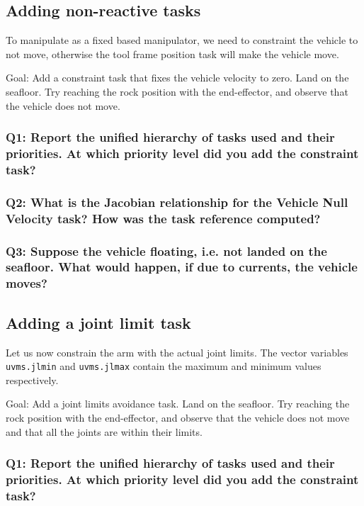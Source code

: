 \documentclass{article}
\begin{document}
\subsection{Adding non-reactive tasks}
To manipulate as a fixed based manipulator, we need to constraint the vehicle to not move, otherwise the tool frame position task will make the vehicle move.

Goal: Add a constraint task that fixes the vehicle velocity to zero. Land on the seafloor. Try reaching the rock position with the end-effector, and observe that the vehicle does not move.

\subsubsection{Q1: Report the unified hierarchy of tasks used and their priorities. At which priority level did you add the constraint task?}

\subsubsection{Q2: What is the Jacobian relationship for the Vehicle Null Velocity task? How was the task reference computed?}

\subsubsection{Q3: Suppose the vehicle floating, i.e. not landed on the seafloor. What would happen, if due to currents, the vehicle moves?}


\subsection{Adding a joint limit task}
Let us now constrain the arm with the actual joint limits. The vector variables \texttt{uvms.jlmin} and \texttt{uvms.jlmax} contain the maximum and minimum values respectively.

Goal: Add a joint limits avoidance task. Land on the seafloor. Try reaching the rock position with the end-effector, and observe that the vehicle does not move and that all the joints are within their limits.

\subsubsection{Q1: Report the unified hierarchy of tasks used and their priorities. At which priority level did you add the constraint task?}
\end{document}
